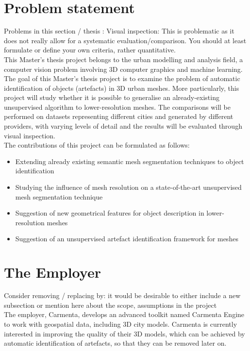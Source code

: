 \documentclass{kththesis}
\begin{document}
\section{Problem statement}
Problems in this section / thesis : 
Visual inspection: This is problematic as it does not really allow for a systematic evaluation/comparison. You should at least formulate or define your own criteria, rather quantitative.
\\
This Master's thesis project belongs to the urban modelling and analysis field, a computer vision problem involving 3D computer graphics and machine learning. 
The goal of this Master’s thesis project is to examine the problem of automatic identification of objects (artefacts) in 3D urban meshes. More particularly, this project will study whether it is possible to generalise an already-existing unsupervised algorithm to lower-resolution meshes. The comparisons will be performed on datasets representing different cities and generated by different providers, with varying levels of detail and the results will be evaluated through visual inspection.  \\
The contributions of this project can be formulated as follows: 
\begin{itemize}
    \item Extending already existing semantic mesh segmentation techniques to object identification
    \item Studying the influence of mesh resolution on a state-of-the-art unsupervised mesh segmentation technique
    \item Suggestion of new geometrical features for object description in lower-resolution meshes
    \item Suggestion of an unsupervised artefact identification framework for meshes
    
\end{itemize}

\section{The Employer}
Consider removing / replacing by: it would be desirable to either include a new subsection or mention here about the scope, assumptions in the project \\ 
The employer, Carmenta, develops an advanced toolkit named Carmenta Engine to work with geospatial data, including 3D city models.  Carmenta is currently  interested  in  improving  the  quality  of  their  3D  models,  which  can  be achieved by  automatic identification of artefacts, so that they can be removed later on. 
\end{document}

